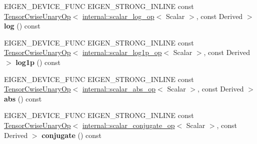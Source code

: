 \begin{DoxyCompactItemize}
\mbox{\label{class_eigen_1_1_tensor_base_3_01_derived_00_01_read_only_accessors_01_4_a608a08786b1c99d7d4bd911e3e941023}} 
E\+I\+G\+E\+N\+\_\+\+D\+E\+V\+I\+C\+E\+\_\+\+F\+U\+NC E\+I\+G\+E\+N\+\_\+\+S\+T\+R\+O\+N\+G\+\_\+\+I\+N\+L\+I\+NE const \hyperlink{class_eigen_1_1_tensor_cwise_unary_op}{Tensor\+Cwise\+Unary\+Op}$<$ \hyperlink{struct_eigen_1_1internal_1_1scalar__log__op}{internal\+::scalar\+\_\+log\+\_\+op}$<$ Scalar $>$, const Derived $>$ {\bfseries log} () const
\item 
\mbox{\label{class_eigen_1_1_tensor_base_3_01_derived_00_01_read_only_accessors_01_4_aab463c553eb730d92d74c156fde28fa9}} 
E\+I\+G\+E\+N\+\_\+\+D\+E\+V\+I\+C\+E\+\_\+\+F\+U\+NC E\+I\+G\+E\+N\+\_\+\+S\+T\+R\+O\+N\+G\+\_\+\+I\+N\+L\+I\+NE const \hyperlink{class_eigen_1_1_tensor_cwise_unary_op}{Tensor\+Cwise\+Unary\+Op}$<$ \hyperlink{struct_eigen_1_1internal_1_1scalar__log1p__op}{internal\+::scalar\+\_\+log1p\+\_\+op}$<$ Scalar $>$, const Derived $>$ {\bfseries log1p} () const
\item 
\mbox{\label{class_eigen_1_1_tensor_base_3_01_derived_00_01_read_only_accessors_01_4_a05d7856b45ea05e6dae6174c7f9a08fd}} 
E\+I\+G\+E\+N\+\_\+\+D\+E\+V\+I\+C\+E\+\_\+\+F\+U\+NC E\+I\+G\+E\+N\+\_\+\+S\+T\+R\+O\+N\+G\+\_\+\+I\+N\+L\+I\+NE const \hyperlink{class_eigen_1_1_tensor_cwise_unary_op}{Tensor\+Cwise\+Unary\+Op}$<$ \hyperlink{struct_eigen_1_1internal_1_1scalar__abs__op}{internal\+::scalar\+\_\+abs\+\_\+op}$<$ Scalar $>$, const Derived $>$ {\bfseries abs} () const
\item 
\mbox{\label{class_eigen_1_1_tensor_base_3_01_derived_00_01_read_only_accessors_01_4_ad78dc59305c20944c496f29cac3d8e7e}} 
E\+I\+G\+E\+N\+\_\+\+D\+E\+V\+I\+C\+E\+\_\+\+F\+U\+NC E\+I\+G\+E\+N\+\_\+\+S\+T\+R\+O\+N\+G\+\_\+\+I\+N\+L\+I\+NE const \hyperlink{class_eigen_1_1_tensor_cwise_unary_op}{Tensor\+Cwise\+Unary\+Op}$<$ \hyperlink{struct_eigen_1_1internal_1_1scalar__conjugate__op}{internal\+::scalar\+\_\+conjugate\+\_\+op}$<$ Scalar $>$, const Derived $>$ {\bfseries conjugate} () const
\item 
\mbox{\label{class_eigen_1_1_tensor_base_3_01_derived_00_01_read_only_accessors_01_4_a3cc1012aa62df33ff0d92f38f7b01e77}} 

\end{DoxyCompactItemize}
